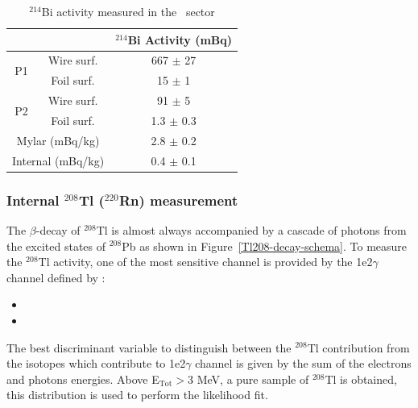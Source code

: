 \documentclass[main.tex]{subfiles}
\begin{document}
\begin{table}
\centering
\begin{tabular}{cc|c}
                    &            &  $^{\text{214}}$Bi Activity (mBq) \\
\midrule
\multirow{2}{*}{P1} & Wire surf. & 667 $\pm$ 27 \\ 
                    & Foil surf. & 15 $\pm$ 1 \\
\midrule
\multirow{2}{*}{P2} & Wire surf. & 91 $\pm$ 5 \\ 
                    & Foil surf. & 1.3 $\pm$ 0.3 \\
\midrule
\multicolumn{2}{c|}{Mylar (mBq/kg)}  & 2.8 $\pm$ 0.2 \\
\midrule
\multicolumn{2}{c|}{Internal (mBq/kg)}  & 0.4 $\pm$ 0.1 \\
\bottomrule
\end{tabular}
\caption{$^{\text{214}}$Bi  activity measured in the \Cd~sector}
\label{Table1e1a-activityMeasurement}
\end{table}

\FloatBarrier


\subsubsection{Internal $^{\text{208}}$Tl ($^{\text{220}}$Rn) measurement}


\NI The $\beta$-decay of $^{\text{208}}$Tl is almost always accompanied by a cascade of photons from the excited states of $^{\text{208}}$Pb as shown in Figure~\ref{Tl208-decay-schema}. To measure the $^{\text{208}}$Tl activity, one of the most sensitive channel is provided by the 1e2$\gamma$ channel defined by : 


\begin{itemize}
\item
\item
\end{itemize}


\NI The best discriminant variable to distinguish between the $^{\text{208}}$Tl contribution from the isotopes which contribute to 1e2$\gamma$ channel is given by the sum of the electrons and photons energies.  Above E$_{\text{Tot}} > $3 MeV, a pure sample of $^{\text{208}}$Tl is obtained, this distribution is used to perform the likelihood fit.
\end{document}
